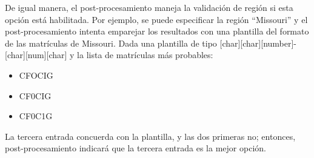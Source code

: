 De igual manera, el post-procesamiento maneja la validación de región si esta opción está habilitada. Por ejemplo, se puede especificar la región “Missouri” y el post-procesamiento intenta emparejar los resultados con una plantilla del formato de las matrículas de Missouri. Dada una plantilla de tipo  [char][char][number]-[char][num][char] y la lista de matrículas más probables:
\begin{itemize}
    \item CFOCIG
    \item CF0CIG
    \item CF0C1G

\end{itemize}

La tercera entrada concuerda con la plantilla, y las dos primeras no; entonces, post-procesamiento indicará que la tercera entrada es la mejor opción.

